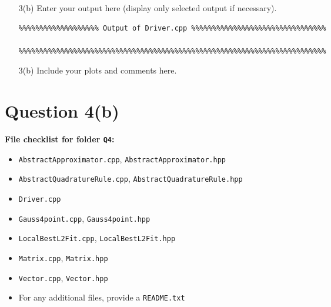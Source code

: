 \documentclass[a4,10pt,fleqn]{article}  %
\newcommand{\il}[1]{\texttt{#1}}
\begin{document}
\vspace{\baselineskip}
\begin{enumerate}

\item[3(b)] Enter your output here (display only selected output if necessary).

\begin{verbatim}
%%%%%%%%%%%%%%%%%%% Output of Driver.cpp %%%%%%%%%%%%%%%%%%%%%%%%%%%%%%%%

%%%%%%%%%%%%%%%%%%%%%%%%%%%%%%%%%%%%%%%%%%%%%%%%%%%%%%%%%%%%%%%%%%%%%%%%%
\end{verbatim}

\item[3(b)] Include your plots and comments here.


\end{enumerate}

\clearpage

\section*{Question 4(b)}

\textbf{File checklist for folder \il{Q4}:}
\begin{itemize}
 \item \il{AbstractApproximator.cpp}, \il{AbstractApproximator.hpp}
 \item \il{AbstractQuadratureRule.cpp}, \il{AbstractQuadratureRule.hpp}
 \item \il{Driver.cpp}
 \item \il{Gauss4point.cpp}, \il{Gauss4point.hpp}
 \item \il{LocalBestL2Fit.cpp}, \il{LocalBestL2Fit.hpp}
 \item \il{Matrix.cpp}, \il{Matrix.hpp}
 \item \il{Vector.cpp}, \il{Vector.hpp}
 \item For any additional files, provide a \il{README.txt}
\end{itemize}
\end{document}

